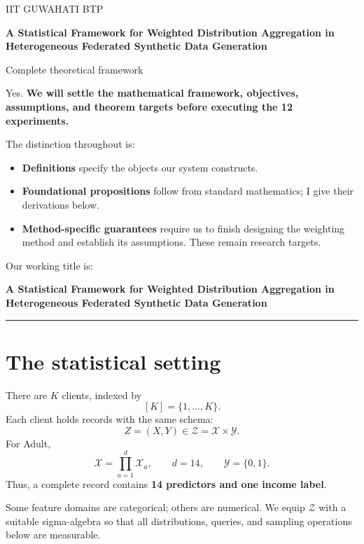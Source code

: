 \documentclass[11pt,a4paper]{article}
\begin{document}
\begin{center}
{\small\color{muted}IIT GUWAHATI BTP\par}
\vspace{9pt}
{\LARGE\bfseries\color{ink}A Statistical Framework for Weighted Distribution Aggregation in Heterogeneous Federated Synthetic Data Generation\par}
\vspace{10pt}
{\large Complete theoretical framework\par}
\end{center}
\vspace{5pt}
Yes. \textbf{We will settle the mathematical framework, objectives, assumptions, and theorem targets before executing the 12 experiments.}

The distinction throughout is:
\begin{itemize}
\item \textbf{Definitions} specify the objects our system constructs.
\item \textbf{Foundational propositions} follow from standard mathematics; I give their derivations below.
\item \textbf{Method-specific guarantees} require us to finish designing the weighting method and establish its assumptions. These remain research targets.
\end{itemize}
Our working title is:

\textbf{A Statistical Framework for Weighted Distribution Aggregation in Heterogeneous Federated Synthetic Data Generation}

\vspace{7pt}\hrule\vspace{10pt}
\tableofcontents
\clearpage

\section{The statistical setting}
There are $K$ clients, indexed by
\[
[K]=\{1,\ldots,K\}.
\]
Each client holds records with the same schema:
\[
Z=(X,Y)\in\mathcal Z=\mathcal X\times\mathcal Y.
\]
For Adult,
\[
\mathcal X=\prod_{a=1}^{d}\mathcal X_a,
\qquad d=14,\qquad\mathcal Y=\{0,1\}.
\]
Thus, a complete record contains \textbf{14 predictors and one income label}.

Some feature domains are categorical; others are numerical. We equip $\mathcal Z$ with a suitable sigma-algebra so that all distributions, queries, and sampling operations below are measurable.
\end{document}
